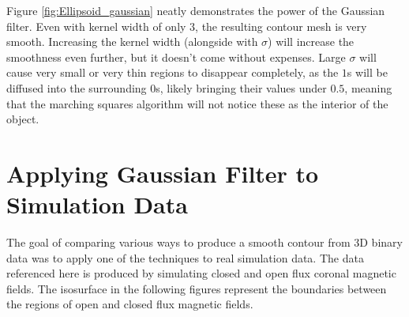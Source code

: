 \documentclass[a4paper,10pt]{report}
\begin{document}
Figure \ref{fig:Ellipsoid_gaussian} neatly demonstrates the power of the Gaussian filter. Even with kernel width of only $3$, the resulting contour mesh is very smooth. Increasing the kernel width (alongside with $\sigma$) will increase the smoothness even further, but it doesn't come without expenses. Large $\sigma$ will cause very small or very thin regions to disappear completely, as the $1$s will be diffused into the surrounding $0$s, likely bringing their values under $0.5$, meaning that the marching squares algorithm will not notice these as the interior of the object.

\section{Applying Gaussian Filter to Simulation Data}\label{sec:simulation}
The goal of comparing various ways to produce a smooth contour from 3D binary data was to apply one of the techniques to real simulation data. The data referenced here is produced by simulating closed and open flux coronal magnetic fields. The isosurface in the following figures represent the boundaries between the regions of open and closed flux magnetic fields.
\end{document}
